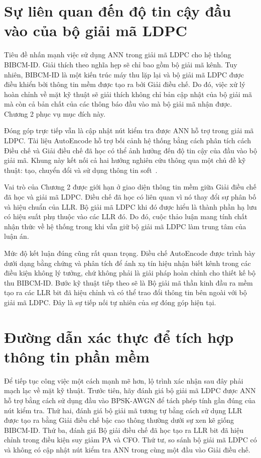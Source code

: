 \section{Sự liên quan đến độ tin cậy đầu vào của bộ giải mã LDPC}
Tiêu đề nhấn mạnh việc sử dụng ANN trong giải mã LDPC cho hệ thống BIBCM-ID. Giải thích theo nghĩa hẹp sẽ chỉ bao gồm bộ giải mã kênh. Tuy nhiên, BIBCM-ID là một kiến ​​trúc máy thu lặp lại và bộ giải mã LDPC được điều khiển bởi thông tin mềm được tạo ra bởi Giải điều chế. Do đó, việc xử lý hoàn chỉnh về mặt kỹ thuật sẽ giải thích không chỉ bản cập nhật của bộ giải mã mà còn cả bản chất của các thông báo đầu vào mà bộ giải mã nhận được. Chương 2 phục vụ mục đích này.

Đóng góp trực tiếp vẫn là cập nhật nút kiểm tra được ANN hỗ trợ trong giải mã LDPC. Tài liệu AutoEncode hỗ trợ bối cảnh hệ thống bằng cách phân tích cách Điều chế và Giải điều chế đã học có thể ảnh hưởng đến độ tin cậy của đầu vào bộ giải mã. Khung này kết nối cả hai hướng nghiên cứu thông qua một chủ đề kỹ thuật: tạo, chuyển đổi và sử dụng thông tin soft~.

Vai trò của Chương 2 được giới hạn ở giao diện thông tin mềm giữa Giải điều chế đã học và giải mã LDPC. Điều chế đã học có liên quan vì nó thay đổi sự phân bố và hiệu chuẩn của LLR. Bộ giải mã LDPC khi đó được hiểu là thành phần hạ lưu có hiệu suất phụ thuộc vào các LLR đó. Do đó, cuộc thảo luận mang tính chất nhận thức về hệ thống trong khi vẫn giữ bộ giải mã LDPC làm trung tâm của luận án.

Mức độ kết luận đúng cũng rất quan trọng. Điều chế AutoEncode được trình bày dưới dạng bằng chứng và phân tích để ánh xạ tín hiệu nhận biết kênh trong các điều kiện không lý tưởng, chứ không phải là giải pháp hoàn chỉnh cho thiết kế bộ thu BIBCM-ID. Bước kỹ thuật tiếp theo sẽ là Bộ giải mã thần kinh đầu ra mềm tạo ra các LLR bit đã hiệu chỉnh và có thể trao đổi thông tin bên ngoài với bộ giải mã LDPC. Đây là sự tiếp nối tự nhiên của sự đóng góp hiện tại.

\section{Đường dẫn xác thực để tích hợp thông tin phần mềm}
Để tiếp tục công việc một cách mạnh mẽ hơn, lộ trình xác nhận sau đây phải mạch lạc về mặt kỹ thuật. Trước tiên, hãy đánh giá bộ giải mã LDPC được ANN hỗ trợ bằng cách sử dụng đầu vào BPSK-AWGN để tách phép tính gần đúng của nút kiểm tra. Thứ hai, đánh giá bộ giải mã tương tự bằng cách sử dụng LLR được tạo ra bằng Giải điều chế bậc cao thông thường dưới sự xen kẽ giống BIBCM-ID. Thứ ba, đánh giá Bộ giải điều chế đã học tạo ra LLR bit đã hiệu chỉnh trong điều kiện suy giảm PA và CFO. Thứ tư, so sánh bộ giải mã LDPC có và không có cập nhật nút kiểm tra ANN trong cùng một đầu vào Giải điều chế.

